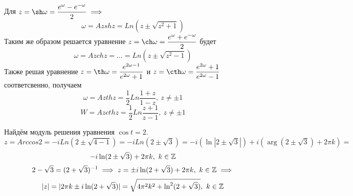 \documentclass[../../main.tex]{subfiles}
\begin{document}
Для $ z = \sh \omega = \dfrac{e^{\omega} - e^{-\omega}}{2} \implies $
\begin{equation}
\label{lec27:29}
\omega = Azsh z = Ln(z \pm \sqrt{z^2 + 1})
\end{equation}
Таким же образом решается уравнение $ z = \ch \omega = \dfrac{e^{\omega} + 
e^{-\omega}}{2} $ будет 
\begin{equation}
\label{lec27:30}
\omega = Azch z = \dots = Ln(z \pm \sqrt{z^2 - 1})
\end{equation}
Также решая уравнение $ z = \th 
\omega = \dfrac{e^{2\omega - 1}}{e^{2\omega} + 1} $ и 
$ z = \cth \omega = \dfrac{e^{2\omega} + 1}{e^{2\omega} - 1} $ соответсвенно,
получаем
\begin{equation}
\label{lec27:31}
\omega = Azth z = \dfrac{1}{2} Ln \dfrac{1 + z}{1 - z},\ z \neq \pm 1
\end{equation}
\begin{equation}
\label{lec27:32}
W = Azcth z = \dfrac{1}{2} Ln \dfrac{z + 1}{z - 1},\
z \neq \pm 1
\end{equation}
\begin{exmp}
	Найдём модуль решения уравнения $ \cos t = 2 $.
	\[
	z = Arccos 2 = -iLn(2 \pm \sqrt{4 - 1}) = 
	-i Ln(2 \pm \sqrt{3}) = -i (\ln|2 \pm \sqrt{3}|) + i(\arg(2 \pm \sqrt{3}) + 
	2\pi k) = \]\[
	-i \ln(2 \pm \sqrt{3}) + 2\pi k,\ k \in \mathbb{Z}	
	\]
	\[
	2 - \sqrt{3} = (2 + \sqrt{3})^{-1} \implies
	z = \pm i \ln (2 + \sqrt{3}) + 2\pi k,\ k \in \mathbb{Z} \implies \] \[
	|z| = |2\pi k \pm i\ln(2 + \sqrt{3})| = 
	\sqrt{4\pi^2 k^2 + \ln^2(2 + \sqrt{3})},\ k \in \mathbb{Z}
	\]
\end{exmp}
\end{document}
